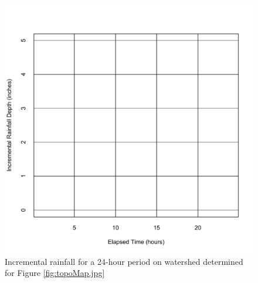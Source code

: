 \documentclass[12pt]{article}
\begin{document}
\begin{enumerate}
\begin{figure}[h!] %
   \centering
   \includegraphics[width=5in]{incr_rain.pdf} 
   \caption{Incremental rainfall for a 24-hour period on watershed determined for Figure \ref{fig:topoMap.jpg}}
   \label{fig:incr_rain.pdf}
\end{figure}


\end{enumerate}
\end{document}

